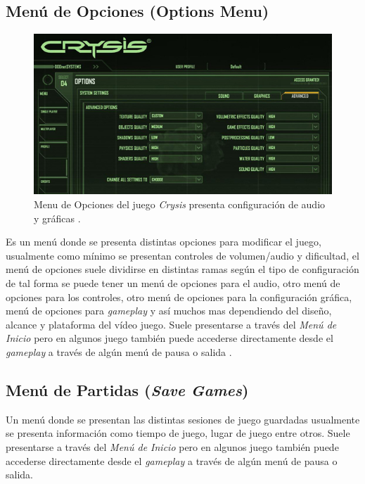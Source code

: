 \subsection{Menú de Opciones (Options Menu)}
\setlength\intextsep{0pt}
\begin{figure}
\includegraphics[width=\linewidth]{semana8/crysis_opmenu.jpg} 
\caption{Menu de Opciones del juego \emph{Crysis} presenta configuración de audio y gráficas \cite{crysis}.}
\end{figure}
Es un menú donde se presenta distintas opciones para modificar el juego, usualmente como mínimo se presentan controles de volumen/audio y dificultad, el menú de opciones suele dividirse en distintas ramas según el tipo de configuración de tal forma se puede tener un menú de opciones para el audio, otro menú de opciones para los controles, otro menú de opciones para la configuración gráfica, menú de opciones para \emph{gameplay} y así muchos mas dependiendo del diseño, alcance y plataforma del vídeo juego. Suele presentarse a través del \emph{Menú de Inicio} pero en algunos juego también puede accederse directamente desde el \emph{gameplay} a través de algún menú de pausa o salida \cite{gb_optionsmenu}.
\subsection{Menú de Partidas (\emph{Save Games})}
Un menú donde se presentan las distintas sesiones de juego guardadas usualmente se presenta información como tiempo de juego, lugar de juego entre otros. Suele presentarse a través del \emph{Menú de Inicio} pero en algunos juego también puede accederse directamente desde el \emph{gameplay} a través de algún menú de pausa o salida.

